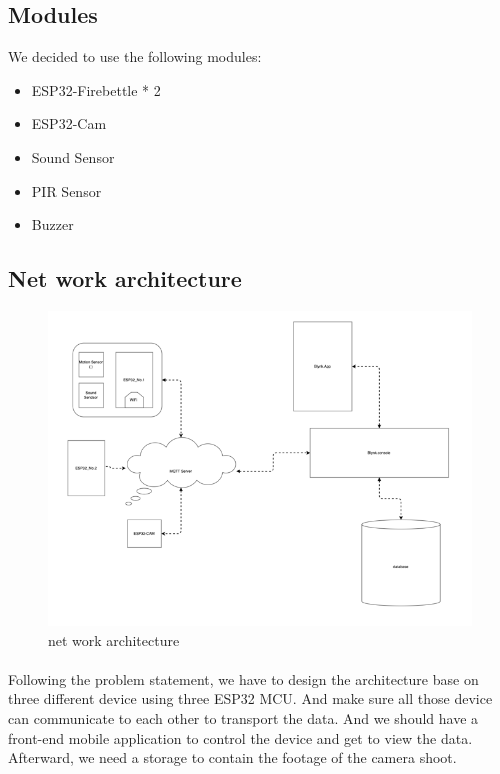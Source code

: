 \documentclass[a4paper, 12pt]{article}        %
\begin{document}
    \subsection{Modules}\label{subsec:modules}

    We decided to use the following modules:

    \begin{itemize}
        \item ESP32-Firebettle * 2
        \item ESP32-Cam
        \item Sound Sensor
        \item PIR Sensor
        \item Buzzer
    \end{itemize}

    \subsection{Net work architecture}\label{subsec:net-work-architecture}

    \begin{figure}[h]
        \centering
        \includegraphics[width=1\textwidth]{CircuitLayOut/img}
        \caption{net work architecture}
        \label{fig:figure1}
    \end{figure}

    \paragraph{}
    Following the problem statement, we have to design the architecture base on three different device using three ESP32 MCU\@.
    And make sure all those device can communicate to each other to transport the data.
    And we should have a front-end mobile application to control the device and get to view the data.
    Afterward, we need a storage to contain the footage of the camera shoot.
\end{document}
